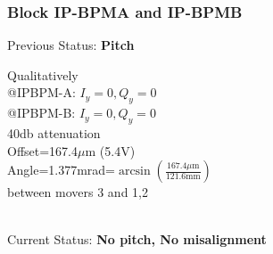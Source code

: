 \documentclass[a4paper,11pt]{book}
\begin{document}
\subsubsection{Block IP-BPMA and IP-BPMB}
Previous Status: \textbf{Pitch}\\
\begin{minipage}{0.5\textwidth}
\end{minipage}\hfill\hspace*{-2cm}\vspace*{2cm}
\begin{minipage}{0.5\textwidth}
Qualitatively\\
@IPBPM-A: $I_y=0, Q_y=0$\\
@IPBPM-B: $I_y=0, Q_y=0$\\
40db attenuation\\
Offset=167.4$\mu$m (5.4V)\\
Angle=1.377mrad=$\arcsin\left(\frac{167.4\mu \text{m}}{121.6\text{mm}}\right)$\\
\hspace*{0.7cm}between movers 3 and 1,2\\
\end{minipage}\\
\vspace*{-2.0cm}
Current Status: \textbf{No pitch, No misalignment}\\
\end{document}

